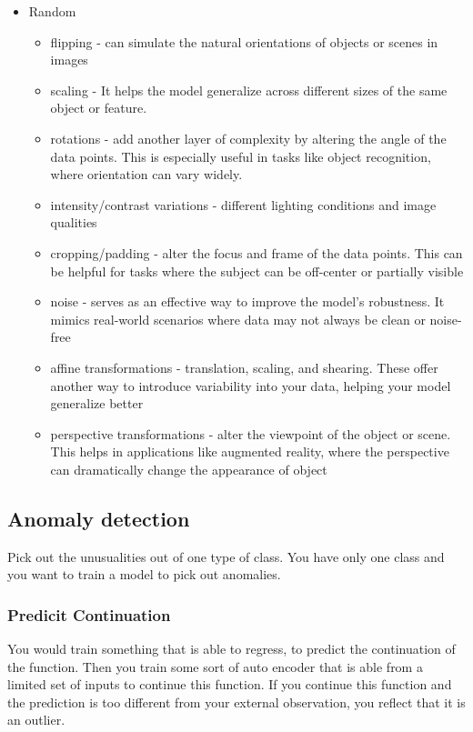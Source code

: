 \documentclass[11pt]{article}
\begin{document}
\begin{itemize}
    \item Random 
    \begin{itemize}
        \item flipping - can simulate the natural orientations of objects or scenes in images
        \item scaling - It helps the model generalize across different sizes of the same object or feature.
        \item rotations - add another layer of complexity by altering the angle of the data points. This is especially useful in tasks like object recognition, where orientation can vary widely.
        \item intensity/contrast variations - different lighting conditions and image qualities
        \item cropping/padding - alter the focus and frame of the data points. This can be helpful for tasks where the subject can be off-center or partially visible
        \item noise - serves as an effective way to improve the model's robustness. It mimics real-world scenarios where data may not always be clean or noise-free
        \item affine transformations - translation, scaling, and shearing. These offer another way to introduce variability into your data, helping your model generalize better
        \item perspective transformations -  alter the viewpoint of the object or scene. This helps in applications like augmented reality, where the perspective can dramatically change the appearance of object
    \end{itemize}
\end{itemize}

\subsection{Anomaly detection}

Pick out the unusualities out of one type of class. You have only one class and you want to train a model to pick out anomalies.

\subsubsection{Predicit Continuation}

You would train something that is able to regress, to predict the continuation of the function. Then you train some sort of auto encoder that is able from a limited set of inputs to continue this function. If you continue this function and the prediction is too different from your external observation, you reflect that it is an outlier.
\end{document}
